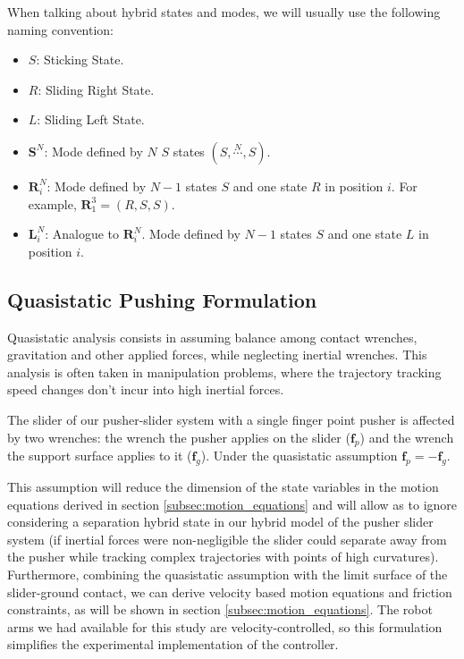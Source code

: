 \documentclass[12,twoside]{TFG-GM}
\theoremstyle{definition}
\theoremstyle{remark}
\begin{document}
When talking about hybrid states and modes, we will usually use the following naming convention:
\begin{itemize}
\item {$S$:} Sticking State.
\item {$R$:} Sliding Right State.
\item {$L$:} Sliding Left State.
\item {$\textbf{S}^N$:} Mode defined by $N$ $S$ states $(S, \stackrel{N}{\cdots}, S)$.
\item {$\textbf{R}_i^N$:} Mode defined by $N - 1$ states $S$ and one state $R$ in position $i$. For example, $\textbf{R}_1^3 = (R, S, S)$.
\item {$\textbf{L}_i^N$:} Analogue to $\textbf{R}_i^N$. Mode defined by $N - 1$ states $S$ and one state $L$ in position $i$.
\end{itemize}

\subsection{Quasistatic Pushing Formulation}
\label{subsec:quasistatic}
Quasistatic analysis consists in assuming balance among contact wrenches, gravitation and other applied forces, while neglecting inertial wrenches. This analysis is often taken in manipulation problems, where the trajectory tracking speed changes don't incur into high inertial forces.

The slider of our pusher-slider system with a single finger point pusher is affected by two wrenches: the wrench the pusher applies on the slider ($\textbf{f}_p$) and the wrench the support surface applies to it ($\textbf{f}_g$). Under the quasistatic assumption $\textbf{f}_p = -\textbf{f}_g$.

This assumption will reduce the dimension of the state variables in the motion equations derived in section \ref{subsec:motion_equations} and will allow as to ignore considering a separation hybrid state in our hybrid model of the pusher slider system (if inertial forces were non-negligible the slider could separate away from the pusher while tracking complex trajectories with points of high curvatures). Furthermore, combining the quasistatic assumption with the limit surface of the slider-ground contact, we can derive velocity based motion equations and friction constraints, as will be shown in section \ref{subsec:motion_equations}. The robot arms we had available for this study are velocity-controlled, so this formulation simplifies the experimental implementation of the controller.
\end{document}

